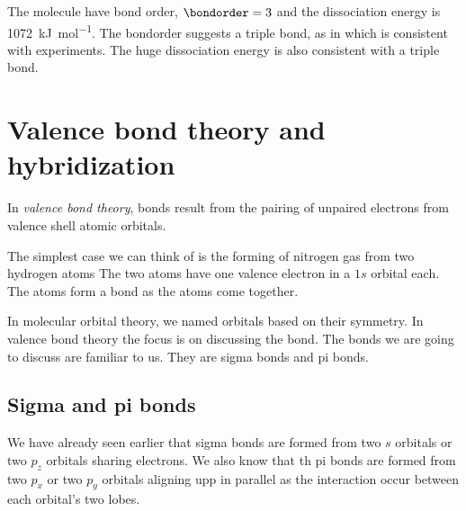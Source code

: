 \documentclass[../mit-general-chemistry.tex]{subfiles}
\begin{document}
The molecule have bond order, $\bondorder = 3$ and the dissociation
energy is \SI{1072}{\kilo\joule\per\mol}. The bondorder suggests a
triple bond, as in  which is consistent with experiments. The
huge dissociation energy is also consistent with a triple bond.





\section{Valence bond theory and hybridization}


In {\em valence bond theory}, bonds result from the pairing of unpaired
electrons from valence shell atomic orbitals.

The simplest case we can think of is the forming of nitrogen gas from
two hydrogen atoms
The two atoms have one valence electron in a $1s$ orbital each. The
atoms form a bond as the atoms come together.

In molecular orbital theory, we named orbitals based on their
symmetry. In valence bond theory the focus is on discussing the
bond. The bonds we are going to discuss are familiar to us. They are
sigma bonds and pi bonds.



\subsection{Sigma and pi bonds}


We have already seen earlier that sigma bonds are formed from two $s$
orbitals or two $p_z$ orbitals sharing electrons. We also know that th
pi bonds are formed from two $p_x$ or two $p_y$
orbitals aligning upp in parallel as the interaction occur between
each orbital's two lobes.
\end{document}
